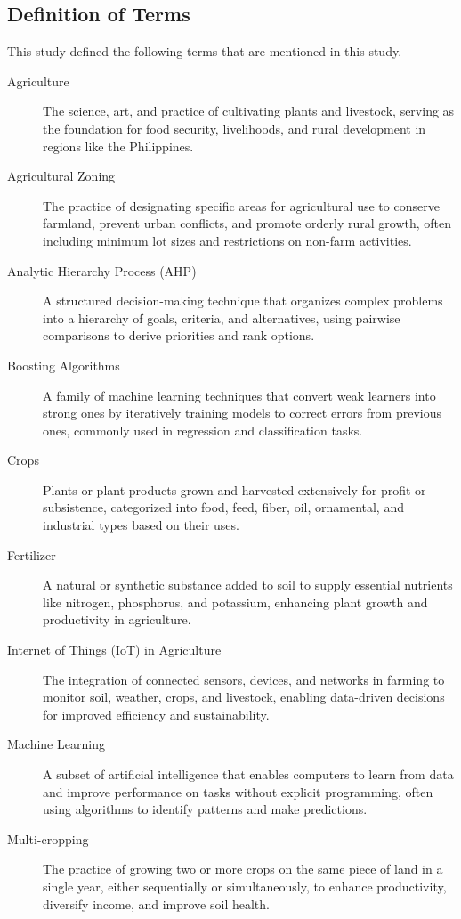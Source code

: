 \begin{doublespace}
\section{Definition of Terms}

This study defined the following terms that are mentioned in this study.
\begin{description}
	\item[Agriculture] 
	The science, art, and practice of cultivating plants and livestock, serving as the foundation for food security, livelihoods, and rural development in regions like the Philippines.
	\item[Agricultural Zoning] 
	The practice of designating specific areas for agricultural use to conserve farmland, prevent urban conflicts, and promote orderly rural growth, often including minimum lot sizes and restrictions on non-farm activities.
	\item[Analytic Hierarchy Process (AHP)] 
	A structured decision-making technique that organizes complex problems into a hierarchy of goals, criteria, and alternatives, using pairwise comparisons to derive priorities and rank options.
	\item[Boosting Algorithms] 
	A family of machine learning techniques that convert weak learners into strong ones by iteratively training models to correct errors from previous ones, commonly used in regression and classification tasks.
	\item[Crops] 
	Plants or plant products grown and harvested extensively for profit or subsistence, categorized into food, feed, fiber, oil, ornamental, and industrial types based on their uses.
	\item[Fertilizer] 
	A natural or synthetic substance added to soil to supply essential nutrients like nitrogen, phosphorus, and potassium, enhancing plant growth and productivity in agriculture.
	\item[Internet of Things (IoT) in Agriculture] 
	The integration of connected sensors, devices, and networks in farming to monitor soil, weather, crops, and livestock, enabling data-driven decisions for improved efficiency and sustainability.
	\item[Machine Learning] 
	A subset of artificial intelligence that enables computers to learn from data and improve performance on tasks without explicit programming, often using algorithms to identify patterns and make predictions.
	\item[Multi-cropping]
	The practice of growing two or more crops on the same piece of land in a single year, either sequentially or simultaneously, to enhance productivity, diversify income, and improve soil health.

\end{description}
\end{doublespace}
